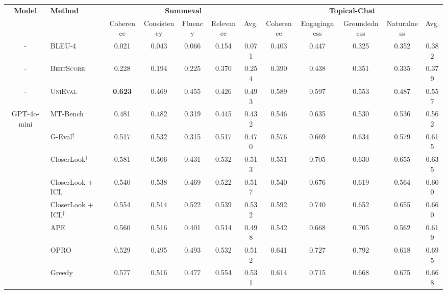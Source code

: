 
\begin{table*} [!t]
\centering
\resizebox{\linewidth}{!} {
\begin{tabular}{cl|ccccc|ccccc}
\toprule
 \multirow{2}{*}{\textbf{Model}} & \multirow{2}{*}{\textbf{Method}}  & \multicolumn{5}{c|}{\textbf{Summeval}}  & \multicolumn{5}{c}{\textbf{Topical-Chat}}  \\
\cmidrule{3-12}
  &  &  Coherence & Consistency & Fluency & Relevance & Avg. & Coherence & Engagingness & Groundedness & Naturalness & Avg.  \\
\midrule
- & BLEU-4  & 0.021 & 0.043 & 0.066 & 0.154 & \cellcolor{c1}0.071 & 0.403 & 0.447 & 0.325 & 0.352 & \cellcolor{c2}0.382  \\
- & \textsc{BertScore}    & 0.228 & 0.194 & 0.225 & 0.370 & \cellcolor{c1}0.254 & 0.390 & 0.438 & 0.351 & 0.335 & \cellcolor{c2}0.379  \\
- & \textsc{UniEval}   & \textbf{0.623} & 0.469 & 0.455 & 0.426 & \cellcolor{c1}0.493 & 0.589 & 0.597 & 0.553 & 0.487 & \cellcolor{c2}0.557  \\
\midrule
\multirow{10}{*}{GPT-4o-mini} & MT-Bench  & 0.481 & 0.482 & 0.319 & 0.445 & \cellcolor{c1}0.432 & 0.546 & 0.635 & 0.530 & 0.536 & \cellcolor{c2}0.562  \\
\cmidrule{2-12}
 & G-Eval$^{\dag}$  & 0.517 & 0.532 & 0.315 & 0.517 & \cellcolor{c1}0.470 & 0.576 & 0.669 & 0.634 & 0.579 & \cellcolor{c2}0.615 \\
 & CloserLook$^{\dag}$  & 0.581 & 0.506 & 0.431 & 0.532 &\cellcolor{c1}0.513 & 0.551 & 0.705 & 0.630 & 0.655 & \cellcolor{c2}0.635 \\
 & CloserLook + ICL  & 0.540 & 0.538 & 0.469 & 0.522 &\cellcolor{c1}0.517 & 0.540 & 0.676 & 0.619 & 0.564 & \cellcolor{c2}0.600 \\
 & CloserLook + ICL$^{\dag}$  & 0.554 & 0.514 & 0.522 & 0.539 & \cellcolor{c1}0.532 & 0.592 & 0.740 & 0.652 & 0.655 & \cellcolor{c2}0.660 \\
\cmidrule{2-12}
 & APE  & 0.560 & 0.516 & 0.401 & 0.514 & \cellcolor{c1}0.498 & 0.542 & 0.668 & 0.705 & 0.562 & \cellcolor{c2}0.619 \\
 & OPRO  & 0.529 & 0.495 & 0.493 & 0.532 & \cellcolor{c1}0.512 & 0.641 & 0.727 & 0.792 & 0.618 & \cellcolor{c2}0.695 \\
 & Greedy  & 0.577 & 0.516 & 0.477 & 0.554 & \cellcolor{c1}0.531 & 0.614 & 0.715 & 0.668 & 0.675 & \cellcolor{c2}0.668 \\

\end{tabular}}
\end{table*}
